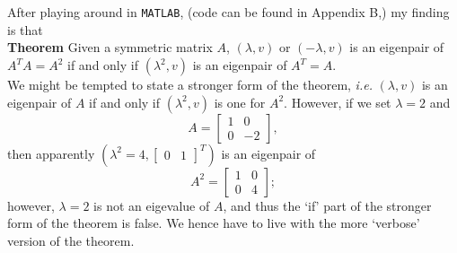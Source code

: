 \documentclass[11pt]{article}
\begin{document}
\section{}
\subsection{}
After playing around in \texttt{MATLAB}, (code can be found in Appendix B,) my finding is that \\[0.4cm] 
\textbf{Theorem} Given a symmetric matrix $A$, $(\lambda, v)$ or $(-\lambda, v)$ is an eigenpair of $A^TA=A^2$ if and only if $(\lambda^2, v)$ is an eigenpair of $A^T=A$.\\[0.3cm]
We might be tempted to state a stronger form of the theorem, \textit{i.e.} $(\lambda,v)$ is an eigenpair of $A$ if and only if $(\lambda^2,v)$ is one for $A^2$. However, if we set $\lambda = 2$ and $$A = \begin{bmatrix} 1 & 0 \\ 0 & -2\end{bmatrix},$$
then apparently $(\lambda^2=4,\begin{bmatrix} 0 & 1\end{bmatrix}^T)$ is an eigenpair of $$A^2 = \begin{bmatrix} 1 &0\\0 &4\end{bmatrix}; $$ however, $\lambda=2$ is not an eigevalue of $A$, and thus the `if' part of the stronger form of the theorem is false. We hence have to live with the more `verbose' version of the theorem.
\end{document}
